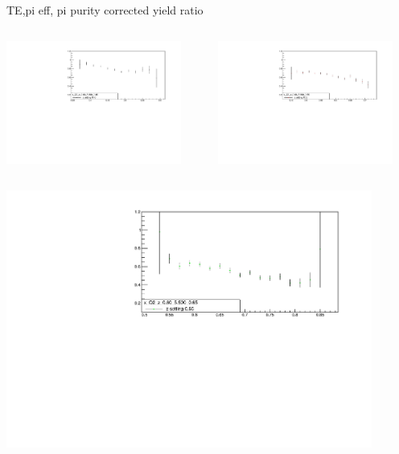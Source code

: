 \begin{frame}{TE,pi eff, pi purity corrected yield ratio}
\begin{columns}
\begin{column}[T]{0.5\textwidth}
\includegraphics[width = 0.9\textwidth]{results/yield/statistics_corr/x_Q2_z_0.60_5.500_0.45_ratio.pdf}
\end{column}
\begin{column}[T]{0.5\textwidth}
\includegraphics[width = 0.9\textwidth]{results/yield/statistics_corr/x_Q2_z_0.60_5.500_0.55_ratio.pdf}
\end{column}
\end{columns}
\begin{columns}
\begin{column}[T]{0.5\textwidth}
\includegraphics[width = 0.9\textwidth]{results/yield/statistics_corr/x_Q2_z_0.60_5.500_0.65_ratio.pdf}

\end{column}
\end{columns}
\end{frame}
